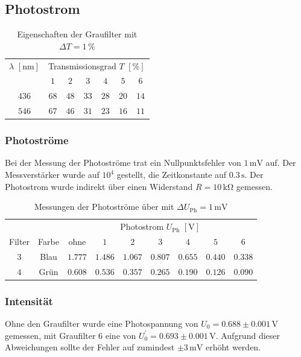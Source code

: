 \documentclass[12pt,a4paper]{scrartcl}
\numberwithin{equation}{section} %
\begin{document}
\subsection{Photostrom}
\begin{table}[h!]
	\centering
	\begin{tabular}{c|c|c|c|c|c|c}
		$\lambda$ $[\mathrm{nm}]$ & \multicolumn{6}{c}{Transmissionsgrad $T$ $[\%]$} \\
		& $1$ & $2$ & $3$ & $4$ & $5$ & $6$ \\
		\hline
		$436$ & $68$ & $48$ & $33$ & $28$ & $20$ & $14$ \\
		$546$ & $67$ & $46$ & $31$ & $23$ & $16$ & $11$
	\end{tabular}
	\caption{Eigenschaften der Graufilter mit $\Delta T=1\,\%$}
	\label{tab:Graufilter}
\end{table}

\subsubsection{Photoströme}
Bei der Messung der Photoströme trat ein Nullpunktsfehler von $1\mathrm{\,mV}$ auf. Der Messverstärker wurde auf $10^4$ gestellt, die Zeitkonstante auf $0.3\mathrm{\,s}$. Der Photostrom wurde indirekt über einen Widerstand $R=10\mathrm{\,k\Omega}$ gemessen.

\begin{table}[h!]
	\centering
	\begin{tabular}{c|c|c|c|c|c|c|c|c}
		 	&& \multicolumn{7}{c}{Photostrom $U_\mathrm{Ph}$ $[\mathrm{V}]$} \\
		Filter & Farbe & ohne & $1$ & $2$ & $3$ & $4$ & $5$ & $6$ \\
		\hline
		$3$ & Blau & $1.777$ & $1.486$ & $1.067$ & $0.807$ & $0.655$ & $0.440$ & $0.338$ \\
		$4$ & Grün & $0.608$ & $0.536$ & $0.357$ & $0.265$ & $0.190$ & $0.126$ & $0.090$
	\end{tabular}
	\caption{Messungen der Photoströme über mit $\Delta U_\mathrm{Ph}=1\mathrm{\,mV}$}
	\label{tab:Photostrom}
\end{table}

\subsubsection{Intensität}
Ohne den Graufilter wurde eine Photospannung von $U_0=0.688\pm0.001\mathrm{\,V}$ gemessen, mit Graufilter $6$ eine von $U_0^\prime=0.693\pm0.001\mathrm{\,V}$. Aufgrund dieser Abweichungen sollte der Fehler auf zumindest $\pm 3\mathrm{\,mV}$ erhöht werden.
\end{document}
